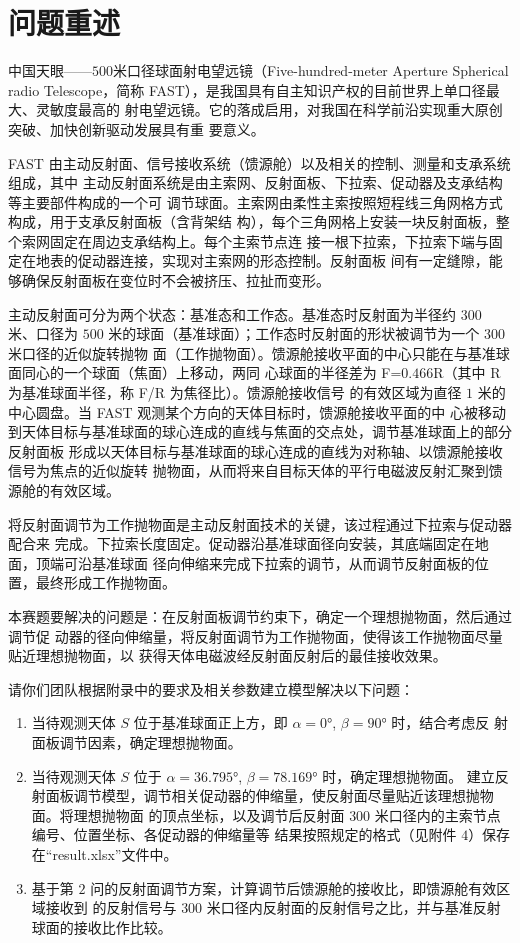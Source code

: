 \documentclass[withoutpreface,bwprint]{cumcmthesis} %
\begin{document}


\section{问题重述}
中国天眼——$500$米口径球面射电望远镜（Five-hundred-meter Aperture Spherical radio
Telescope，简称 FAST），是我国具有自主知识产权的目前世界上单口径最大、灵敏度最高的
射电望远镜。它的落成启用，对我国在科学前沿实现重大原创突破、加快创新驱动发展具有重
要意义。

FAST 由主动反射面、信号接收系统（馈源舱）以及相关的控制、测量和支承系统组成，其中
主动反射面系统是由主索网、反射面板、下拉索、促动器及支承结构等主要部件构成的一个可
调节球面。主索网由柔性主索按照短程线三角网格方式构成，用于支承反射面板（含背架结
构），每个三角网格上安装一块反射面板，整个索网固定在周边支承结构上。每个主索节点连
接一根下拉索，下拉索下端与固定在地表的促动器连接，实现对主索网的形态控制。反射面板
间有一定缝隙，能够确保反射面板在变位时不会被挤压、拉扯而变形。

主动反射面可分为两个状态：基准态和工作态。基准态时反射面为半径约 $300$ 米、口径为
$500$ 米的球面（基准球面）；工作态时反射面的形状被调节为一个 $300$ 米口径的近似旋转抛物
面（工作抛物面）。馈源舱接收平面的中心只能在与基准球面同心的一个球面（焦面）上移动，两同
心球面的半径差为 F=$0.466$R（其中 R 为基准球面半径，称 F/R 为焦径比）。馈源舱接收信号
的有效区域为直径 $1$ 米的中心圆盘。当 FAST 观测某个方向的天体目标时，馈源舱接收平面的中
心被移动到天体目标与基准球面的球心连成的直线与焦面的交点处，调节基准球面上的部分反射面板
形成以天体目标与基准球面的球心连成的直线为对称轴、以馈源舱接收信号为焦点的近似旋转
抛物面，从而将来自目标天体的平行电磁波反射汇聚到馈源舱的有效区域。

将反射面调节为工作抛物面是主动反射面技术的关键，该过程通过下拉索与促动器配合来
完成。下拉索长度固定。促动器沿基准球面径向安装，其底端固定在地面，顶端可沿基准球面
径向伸缩来完成下拉索的调节，从而调节反射面板的位置，最终形成工作抛物面。

本赛题要解决的问题是：在反射面板调节约束下，确定一个理想抛物面，然后通过调节促
动器的径向伸缩量，将反射面调节为工作抛物面，使得该工作抛物面尽量贴近理想抛物面，以
获得天体电磁波经反射面反射后的最佳接收效果。

请你们团队根据附录中的要求及相关参数建立模型解决以下问题：
\begin{enumerate}
    \item 当待观测天体 $S$ 位于基准球面正上方，即 $\alpha = 0°$, $\beta = 90°$ 时，结合考虑反
          射面板调节因素，确定理想抛物面。
    \item 当待观测天体 $S$ 位于 $\alpha = 36.795°$, $\beta = 78.169°$ 时，确定理想抛物面。
          建立反射面板调节模型，调节相关促动器的伸缩量，使反射面尽量贴近该理想抛物面。将理想抛物面
          的顶点坐标，以及调节后反射面 $300$ 米口径内的主索节点编号、位置坐标、各促动器的伸缩量等
          结果按照规定的格式（见附件 $4$）保存在“result.xlsx”文件中。
    \item 基于第 $2$ 问的反射面调节方案，计算调节后馈源舱的接收比，即馈源舱有效区域接收到
          的反射信号与 $300$ 米口径内反射面的反射信号之比，并与基准反射球面的接收比作比较。
\end{enumerate}
\end{document}
